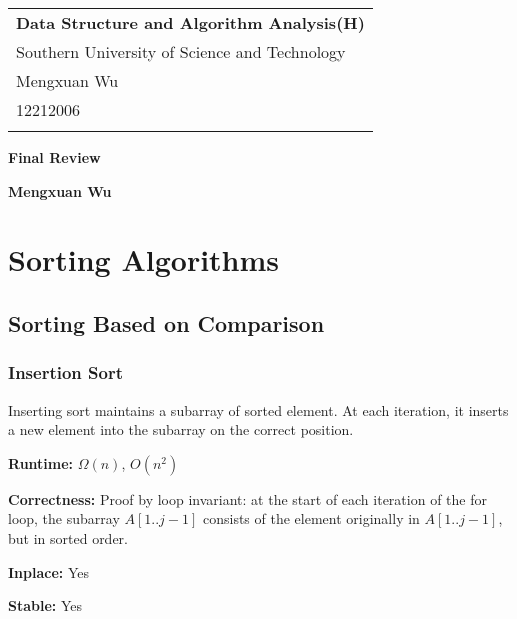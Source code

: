 \documentclass[a4paper,12pt]{article}
\begin{document}
\thispagestyle{empty} %

\begin{tabular}{p{15.5cm}}
{\large \bf Data Structure and Algorithm Analysis(H)} \\
Southern University of Science and Technology \\ Mengxuan Wu \\ 12212006 \\
\hline
\\
\end{tabular}

\vspace*{0.3cm} %

\begin{center}
	{\Large \bf Final Review}
	\vspace{2mm}

	{\bf Mengxuan Wu}
		
\end{center}  

\vspace{0.4cm}

\section{Sorting Algorithms} 

\subsection{Sorting Based on Comparison}

\subsubsection{Insertion Sort}

Inserting sort maintains a subarray of sorted element.
At each iteration, it inserts a new element into the subarray on the correct position.

\textbf{Runtime:} 
$\Omega(n)$, $O(n^2)$

\textbf{Correctness:} 
Proof by loop invariant: at the start of each iteration of the for loop, the subarray $A[1..j - 1]$ consists of the element originally in $A[1..j - 1]$, but in sorted order.

\textbf{Inplace:} 
Yes

\textbf{Stable:} 
Yes
\end{document}
